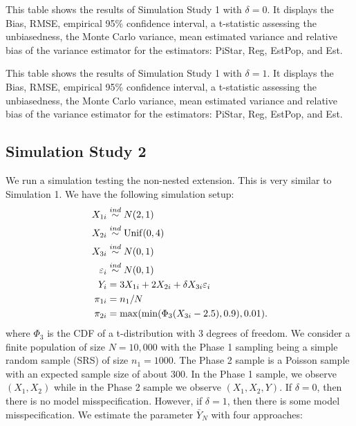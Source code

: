 \documentclass[12pt]{article}
\begin{document}
\begin{table}[ht!]
  \centering
  
\caption{This table shows the results of Simulation Study 1 with $\delta = 0$.
  It displays the Bias, RMSE, empirical 95\% confidence interval, a t-statistic
  assessing the unbiasedness, the Monte Carlo variance, mean estimated variance
  and relative bias of the variance estimator for the estimators: PiStar, Reg,
  EstPop, and Est.}
\label{tab:tpdc0-mean}
\end{table}

\begin{table}[ht!]
  \centering
  
\caption{This table shows the results of Simulation Study 1 with $\delta = 1$.
  It displays the Bias, RMSE, empirical 95\% confidence interval, a t-statistic
  assessing the unbiasedness, the Monte Carlo variance, mean estimated variance
  and relative bias of the variance estimator for the estimators: PiStar, Reg,
  EstPop, and Est.}
\label{tab:tpdc1-mean}
\end{table}

\subsection{Simulation Study 2}

We run a simulation testing the non-nested extension. This is very similar to
Simulation 1. We have the following simulation setup:
$$
\begin{aligned}
X_{1i} &\stackrel{ind}{\sim} N(2, 1) \\
X_{2i} &\stackrel{ind}{\sim} \rm{Unif}(0, 4) \\
X_{3i} &\stackrel{ind}{\sim} N(0, 1) \\
\varepsilon_i &\stackrel{ind}{\sim} N(0, 1) \\
Y_{i} &= 3 X_{1i} + 2 X_{2i} + \delta X_{3i} \varepsilon_i \\
\pi_{1i} &= n_1 / N \\
\pi_{2i} &= \max(\min(\Phi_3(X_{3i} - 2.5), 0.9), 0.01).
\end{aligned}
$$
where $\Phi_3$ is the CDF of a t-distribution with 3 degrees of freedom.
We consider a finite population of size $N = 10,000$ with the Phase 1 
sampling being a simple random sample (SRS) of size $n_1 = 1000$. The Phase 2
sample is a Poisson sample with an expected sample size of about 300.
In the Phase 1 sample, we observe 
$(X_1, X_2)$ while in the Phase 2 sample we observe $(X_1, X_2, Y)$. 
If $\delta = 0$, then there is no model misspecification. However, if $\delta =
1$, then there is some model misspecification. We estimate
the parameter $\bar Y_N$ with four approaches:
\end{document}

